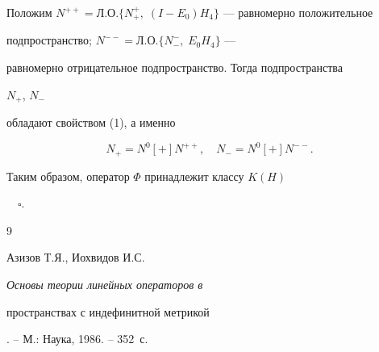 Положим $N^{++}=Л.О.\{N^+_+,\;(I-E_0)H_4\}$ --- равномерно положительное


подпространство; $N^{--}=Л.О.\{N^-_-,\;E_0H_4\}$ ---


равномерно отрицательное подпространство. Тогда подпространства


$N_+$, $N_-$


обладают свойством (1), а именно


$$


N_+=N^0[+]N^{++},\quad N_-=N^0[+]N^{--}.


$$





Таким образом, оператор $\Phi$ принадлежит классу $K(H)$


$\quad\square$.





\begin{thebibliography}{9}







Азизов Т.Я., Иохвидов И.С. {\em Основы теории линейных операторов в


пространствах с индефинитной метрикой}. -- М.: Наука, 1986. -- 352~с.








\end{thebibliography}





\vskip 2cm


















